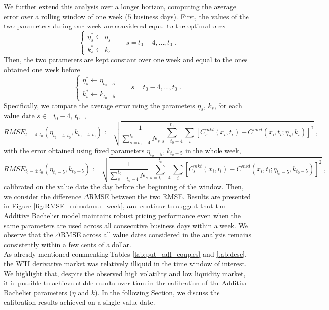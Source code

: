 \documentclass[12pt]{article}
\theoremstyle{definition}
\theoremstyle{remark}
\numberwithin{theorem}{section}
\numberwithin{proposition}{section}
\numberwithin{lemma}{section}
\numberwithin{corollary}{section}
\numberwithin{definition}{section}
\numberwithin{remark}{section}
\numberwithin{example}{section}
\begin{document}

We further extend this analysis over a longer horizon, computing the average error over a rolling window of one week ($5$ business days). First, the values of the two parameters during one week are considered equal to the optimal ones
\[
\begin{cases}
\eta^*_s\leftarrow\eta_{s}&\\
k^*_s\leftarrow k_{s}&
\end{cases}\quad s=t_0-4,...,t_0\,\,.
\]
Then, the two parameters are kept constant over one week and equal to the ones obtained one week before
\[
\begin{cases}
\eta^*_s\leftarrow\eta_{t_0-5}&\\
k^*_s\leftarrow k_{t_0-5}&
\end{cases}\quad s=t_0-4,...,t_0\,\,.
\]
Specifically, we compare the average error using the parameters $\eta_s,\,k_s$, for each value date $s\in\left[t_0-4,\,t_0\right]$,
\[
\displaystyle RMSE_{t_0-4:t_0}(\eta_{t_0-4:t_0}, k_{t_0-4:t_0}) :=\sqrt{\frac{1}{\sum_{s=t_0-4}^{t_0}N_s}\sum_{s=t_0-4}^{t_0}\sum_{i}\left[ C_{s}^{mkt} (x_i,t_i) - C^{mod}(x_i,t_i; \eta_s, k_s) \right]^2} \; ,
\]
with the error obtained using fixed parameters $\eta_{t_0-5},\,k_{t_0-5}$ in the whole week,
\[
\displaystyle RMSE_{t_0-4:t_0}(\eta_{t_0-5}, k_{t_0-5}) :=\sqrt{\frac{1}{\sum_{s=t_0-4}^{t_0}N_s} \sum_{s=t_0-4}^{t_0}\sum_{i}\left[ C_{s}^{mkt} (x_i,t_i) - C^{mod}(x_i,t_i; \eta_{t_0-5}, k_{t_0-5}) \right]^2} \; ,
\]
calibrated on the value date the day before the beginning of the window. Then, we consider the difference $\Delta$RMSE between the two RMSE. Results are presented in Figure \ref{fig:RMSE_robustness_week}, and continue to suggest that the Additive Bachelier model maintains robust pricing performance even when the same parameters are used across %
all consecutive business days within a week. We observe that the $\Delta$RMSE across all value dates considered in the analysis remains consistently within a few cents of a dollar.\\
As already mentioned commenting Tables \ref{tab:put_call_couples} and \ref{tab:desc}, the WTI derivative market was relatively illiquid in the time window of interest.
We highlight that, despite the observed high volatility and low liquidity market, it is possible to achieve stable results over time in the calibration of the Additive Bachelier parameters ($\eta$ and $k$). In the following Section, 
we discuss the calibration results achieved on a single value date. 
\end{document}
